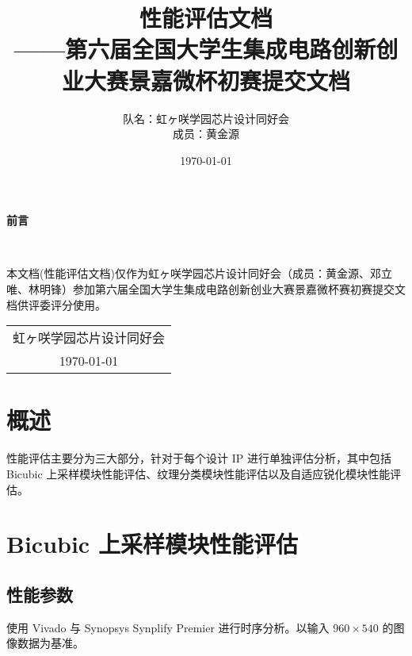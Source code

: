 \documentclass[12pt, a4paper, oneside]{ctexbook}
\title{{\Huge{\textbf{性能评估文档}}}\normalsize{\\——第六届全国大学生集成电路创新创业大赛景嘉微杯初赛提交文档}}
\author{队名：虹ヶ咲学园芯片设计同好会\\ 成员：黄金源\space邓立唯\space林明锋}
\date{\today}
\begin{document}
	
	\maketitle	
	\setcounter{page}{1}
	\begin{center}
		\Huge\textbf{前言}
	\end{center}~\
	
	本文档(性能评估文档)仅作为虹ヶ咲学园芯片设计同好会（成员：黄金源、邓立唯、林明锋）参加第六届全国大学生集成电路创新创业大赛景嘉微杯赛初赛提交文档供评委评分使用。
	~\\
	\begin{flushright}
		\begin{tabular}{c}
			虹ヶ咲学园芯片设计同好会\\
			\today
		\end{tabular}
	\end{flushright}
	\newpage
	\setcounter{page}{1}
	\tableofcontents
	\newpage
	\setcounter{page}{1}
	
	\chapter{概述}
	性能评估主要分为三大部分，针对于每个设计 IP 进行单独评估分析，其中包括 Bicubic 上采样模块性能评估、纹理分类模块性能评估以及自适应锐化模块性能评估。
	
	\chapter{Bicubic 上采样模块性能评估}
	\section{性能参数}
	使用 Vivado 与 Synopsys Synplify Premier 进行时序分析。以输入 $960\times540$ 的图像数据为基准。
\end{document}
